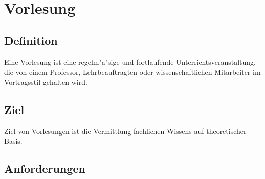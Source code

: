 \section{Vorlesung}

\subsection{Definition} 
	Eine Vorlesung ist eine regelm"a"sige und fortlaufende Unterrichtsveranstaltung, die von einem
	Professor, Lehrbeauftragten oder wissenschaftlichen Mitarbeiter im Vortragsstil gehalten wird.


\subsection{Ziel} 
	Ziel von Vorlesungen ist die Vermittlung fachlichen Wissens auf theoretischer Basis. 

\subsection{Anforderungen} \label{vorlesung:anforderungen}

